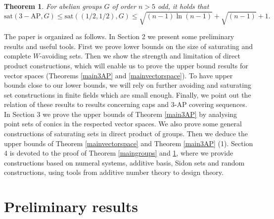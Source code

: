 \documentclass[11pt]{article}
\numberwithin{table}{section}
\newcommand{\F}{{\mathbb F}}
\newcommand{\sat}{\mathrm{sat}}
\newtheorem{theorem}{Theorem}[section]
\theoremstyle{definition}
\DeclareMathOperator{\AG}{{AG}}
\begin{document}
	\begin{theorem}\label{proby}
		For abelian groups $G$ of order $n > 5$ odd, it holds that
		$$\sat(3-\mathrm{AP},G) \leq \sat((1/2,1/2),G) \leq \sqrt{(n-1)\ln{(n-1)}}+ \sqrt{(n-1)}+1.$$    
	\end{theorem}
	
	
	
	
	The paper is organized as follows. 
	In Section 2 we present some preliminary results and useful tools. First we prove lower bounds on the size of  saturating and complete $W$-avoiding sets. Then we show the strength and limitation of direct product constructions, which will enable us to prove the upper bound results for vector spaces (Theorems \ref{main3AP} and \ref{mainvectorspace}). To have upper bounds close to our lower bounds, we will rely on  further avoiding and saturating set constructions in finite fields which are small enough.  Finally, we point out the relation of these results to results concerning caps and $3$-AP covering sequences.\\
	In Section 3 we prove the upper bounds of Theorem \ref{main3AP} by analysing point sets of conics in the respected vector spaces.
	We also prove some general constructions of saturating sets in direct product of groups. Then we deduce the upper bounds of Theorem \ref{mainvectorspace} and Theorem \ref{main3AP} (1).
	Section 4 is devoted to the proof of Theorem \ref{maingroups} and \ref{proby}, where we provide constructions based on numeral systems, additive basis, Sidon sets and random constructions, using tools from additive number theory to design theory. 
	
	\section{Preliminary results}
	
\end{document}
